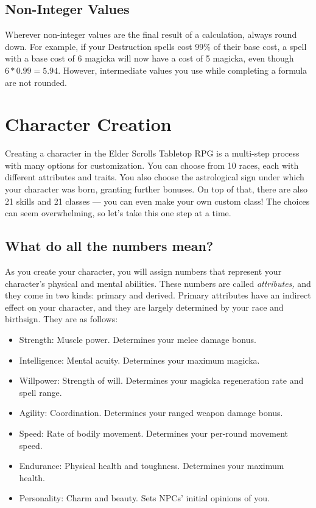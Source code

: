 \documentclass[12pt]{book}
\begin{document}
\section{Non-Integer Values}
Wherever non-integer values are the final result of a calculation, always round down. For example, if your Destruction spells cost 99\% of their base cost, a spell with a base cost of 6 magicka will now have a cost of 5 magicka, even though $6*0.99=5.94$. However, intermediate values you use while completing a formula are not rounded.

\chapter{Character Creation}
Creating a character in the Elder Scrolls Tabletop RPG is a multi-step process with many options for customization. You can choose from 10 races, each with different attributes and traits. You also choose the astrological sign under which your character was born, granting further bonuses. On top of that, there are also 21 skills and 21 classes --- you can even make your own custom class! The choices can seem overwhelming, so let's take this one step at a time.

\section{What do all the numbers mean?}

As you create your character, you will assign numbers that represent your character's physical and mental abilities. These numbers are called \textit{attributes,} and they come in two kinds: primary and derived. Primary attributes have an indirect effect on your character, and they are largely determined by your race and birthsign. They are as follows:
\begin{itemize}
	\item Strength: Muscle power. Determines your melee damage bonus.
	\item Intelligence: Mental acuity. Determines your maximum magicka.
	\item Willpower: Strength of will. Determines your magicka regeneration rate and spell range.
	\item Agility: Coordination. Determines your ranged weapon damage bonus.
	\item Speed: Rate of bodily movement. Determines your per-round movement speed.
	\item Endurance: Physical health and toughness. Determines your maximum health.
	\item Personality: Charm and beauty. Sets NPCs' initial opinions of you.
\end{itemize}
\end{document}
